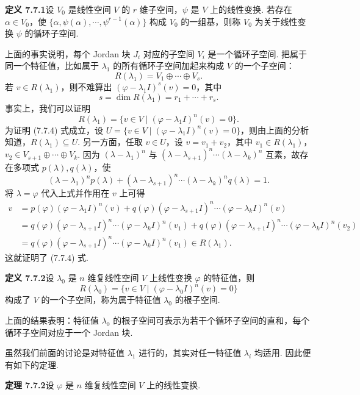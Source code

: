 \documentclass[UTF8, 12pt, fontset=fandol, oneside]{ctexart}
\begin{document}
\noindent\textbf{定义 7.7.1}\quad 设 $V_0$ 是线性空间 $V$ 的 $r$ 维子空间，$\psi$ 是 $V$ 上的线性变换. 若存在 $\alpha\in V_0$，使 $\{\alpha,\psi(\alpha),\cdots,\psi^{r-1}(\alpha)\}$ 构成 $V_0$ 的一组基，则称 $V_0$ 为关于线性变换 $\psi$ 的循环子空间.

上面的事实说明，每个 Jordan 块 $J_i$ 对应的子空间 $V_i$ 是一个循环子空间. 把属于同一个特征值，比如属于 $\lambda_1$ 的所有循环子空间加起来构成 $V$ 的一个子空间：
\[
R(\lambda_1)=V_1\oplus\cdots\oplus V_s.
\]
若 $v\in R(\lambda_1)$，则不难算出 $(\varphi-\lambda_1I)^s(v)=0$，其中
\[
s=\dim R(\lambda_1)=r_1+\cdots+r_s.
\]
事实上，我们可以证明
\begin{equation}
R(\lambda_1)=\{v\in V\mid(\varphi-\lambda_1I)^n(v)=0\}.
\tag{7.7.4}
\end{equation}
为证明 (7.7.4) 式成立，设 $U=\{v\in V\mid(\varphi-\lambda_1I)^n(v)=0\}$，则由上面的分析知道，$R(\lambda_1)\subseteq U$. 另一方面，任取 $v\in U$，设 $v=v_1+v_2$，其中 $v_1\in R(\lambda_1)$，$v_2\in V_{s+1}\oplus\cdots\oplus V_k$. 因为 $(\lambda-\lambda_1)^n$ 与 $(\lambda-\lambda_{s+1})^n\cdots(\lambda-\lambda_k)^n$ 互素，故存在多项式 $p(\lambda),q(\lambda)$，使
\[
(\lambda-\lambda_1)^np(\lambda)+(\lambda-\lambda_{s+1})^n\cdots(\lambda-\lambda_k)^nq(\lambda)=1.
\]
将 $\lambda=\varphi$ 代入上式并作用在 $v$ 上可得
\[
\begin{aligned}
v&=p(\varphi)(\varphi-\lambda_1I)^n(v)+q(\varphi)(\varphi-\lambda_{s+1}I)^n\cdots(\varphi-\lambda_kI)^n(v)\\
&=q(\varphi)(\varphi-\lambda_{s+1}I)^n\cdots(\varphi-\lambda_kI)^n(v_1)+q(\varphi)(\varphi-\lambda_{s+1}I)^n\cdots(\varphi-\lambda_kI)^n(v_2)\\
&=q(\varphi)(\varphi-\lambda_{s+1}I)^n\cdots(\varphi-\lambda_kI)^n(v_1)\in R(\lambda_1).
\end{aligned}
\]
这就证明了 (7.7.4) 式.

\noindent\textbf{定义 7.7.2}\quad 设 $\lambda_0$ 是 $n$ 维复线性空间 $V$ 上线性变换 $\varphi$ 的特征值，则
\[
R(\lambda_0)=\{v\in V\mid(\varphi-\lambda_0I)^n(v)=0\}
\]
构成了 $V$ 的一个子空间，称为属于特征值 $\lambda_0$ 的根子空间.

上面的结果表明：特征值 $\lambda_0$ 的根子空间可表示为若干个循环子空间的直和，每个循环子空间对应于一个 Jordan 块.

虽然我们前面的讨论是对特征值 $\lambda_1$ 进行的，其实对任一特征值 $\lambda_i$ 均适用. 因此便有如下的定理.

\noindent\textbf{定理 7.7.2}\quad 设 $\varphi$ 是 $n$ 维复线性空间 $V$ 上的线性变换.
\end{document}
